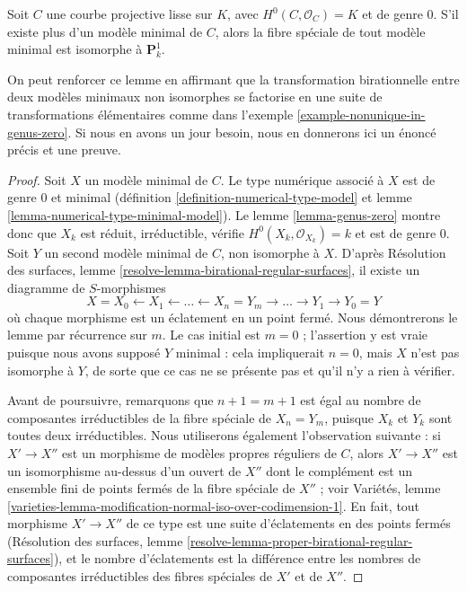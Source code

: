 \begin{lemma}
\label{lemma-nonuniqueness}
Soit $C$ une courbe projective lisse sur $K$, avec
$H^0(C, \mathcal{O}_C) = K$ et de genre $0$. S'il existe plus d'un modèle
minimal de $C$, alors la fibre spéciale de tout modèle minimal est
isomorphe à $\mathbf{P}^1_k$.
\end{lemma}

\noindent
On peut renforcer ce lemme en affirmant que la transformation birationnelle
entre deux modèles minimaux non isomorphes se factorise en une suite de
transformations élémentaires comme dans l'exemple
\ref{example-nonunique-in-genus-zero}. Si nous en avons un jour besoin,
nous en donnerons ici un énoncé précis et une preuve.

\begin{proof}
Soit $X$ un modèle minimal de $C$. Le type numérique associé à $X$ est de
genre $0$ et minimal (définition \ref{definition-numerical-type-model} et
lemme \ref{lemma-numerical-type-minimal-model}). Le lemme
\ref{lemma-genus-zero} montre donc que $X_k$ est réduit, irréductible,
vérifie $H^0(X_k, \mathcal{O}_{X_k}) = k$ et est de genre $0$.
Soit $Y$ un second modèle minimal de $C$, non isomorphe à $X$.
D'après Résolution des surfaces, lemme
\ref{resolve-lemma-birational-regular-surfaces}, il existe un diagramme de
$S$-morphismes
$$
X = X_0 \leftarrow X_1 \leftarrow \ldots \leftarrow X_n = Y_m
\to \ldots \to Y_1 \to Y_0 = Y
$$
où chaque morphisme est un éclatement en un point fermé. Nous démontrerons
le lemme par récurrence sur $m$. Le cas initial est $m=0$ ; l'assertion y
est vraie puisque nous avons supposé $Y$ minimal : cela impliquerait
$n=0$, mais $X$ n'est pas isomorphe à $Y$, de sorte que ce cas ne se
présente pas et qu'il n'y a rien à vérifier.

\medskip\noindent
Avant de poursuivre, remarquons que $n+1=m+1$ est égal au nombre de
composantes irréductibles de la fibre spéciale de $X_n=Y_m$, puisque
$X_k$ et $Y_k$ sont toutes deux irréductibles. Nous utiliserons également
l'observation suivante : si $X' \to X''$ est un morphisme de modèles
propres réguliers de $C$, alors $X' \to X''$ est un isomorphisme au-dessus
d'un ouvert de $X''$ dont le complément est un ensemble fini de points
fermés de la fibre spéciale de $X''$ ; voir Variétés, lemme
\ref{varieties-lemma-modification-normal-iso-over-codimension-1}.
En fait, tout morphisme $X' \to X''$ de ce type est une suite d'éclatements
en des points fermés (Résolution des surfaces, lemme
\ref{resolve-lemma-proper-birational-regular-surfaces}), et le nombre
d'éclatements est la différence entre les nombres de composantes
irréductibles des fibres spéciales de $X'$ et de $X''$.


\end{proof}
